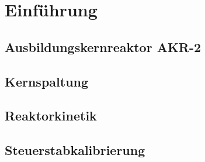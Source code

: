 \section{Einführung}
	\subsection{Ausbildungskernreaktor AKR-2}
	\subsection{Kernspaltung}
	\subsection{Reaktorkinetik}
	
	\subsection{Steuerstabkalibrierung}
	
